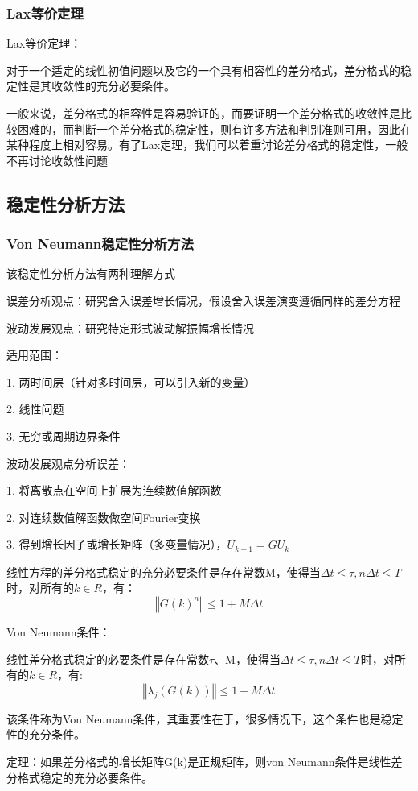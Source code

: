 \documentclass{article}
\begin{document}
\subsubsection{Lax等价定理}
Lax等价定理：

对于一个适定的线性初值问题以及它的一个具有相容性的差分格式，差分格式的稳定性是其收敛性的充分必要条件。

一般来说，差分格式的相容性是容易验证的，而要证明一个差分格式的收敛性是比较困难的，而判断一个差分格式的稳定性，则有许多方法和判别准则可用，因此在某种程度上相对容易。有了Lax定理，我们可以着重讨论差分格式的稳定性，一般不再讨论收敛性问题

\subsection{稳定性分析方法}

\subsubsection{Von Neumann稳定性分析方法}
该稳定性分析方法有两种理解方式

误差分析观点：研究舍入误差增长情况，假设舍入误差演变遵循同样的差分方程

波动发展观点：研究特定形式波动解振幅增长情况

适用范围：

1. 两时间层（针对多时间层，可以引入新的变量）

2. 线性问题

3. 无穷或周期边界条件

波动发展观点分析误差：

1. 将离散点在空间上扩展为连续数值解函数

2. 对连续数值解函数做空间Fourier变换

3. 得到增长因子或增长矩阵（多变量情况），$U_{k+1} = GU_{k}$

线性方程的差分格式稳定的充分必要条件是存在常数M，使得当$\Delta t\le \tau, n\Delta t\le T$时，对所有的$k\in R$，有：
$$‖G(k)^n‖\le1+M\Delta t$$

Von Neumann条件：

线性差分格式稳定的必要条件是存在常数$\tau$、M，使得当$\Delta t\le \tau, n\Delta t\le T$时，对所有的$k\in R$，有:
$$‖\lambda_j(G(k))‖\le1+M\Delta t$$

该条件称为Von Neumann条件，其重要性在于，很多情况下，这个条件也是稳定性的充分条件。

定理：如果差分格式的增长矩阵G(k)是正规矩阵，则von Neumann条件是线性差分格式稳定的充分必要条件。
\end{document}
